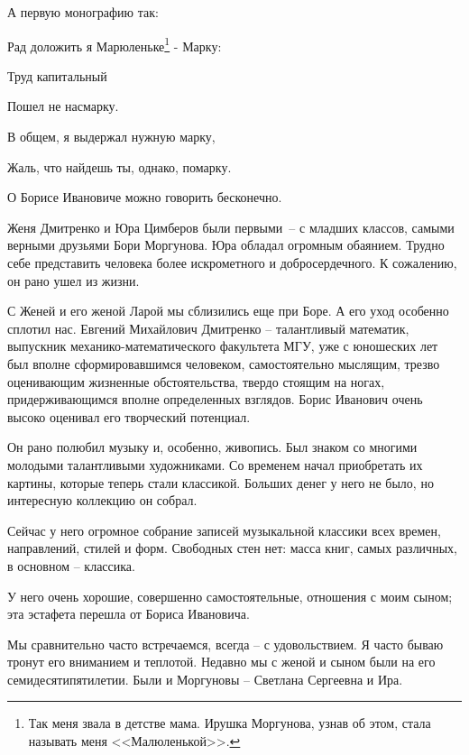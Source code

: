 \indent

\noindent
А первую монографию так:

\indent

{\itshape	

	Рад доложить я Марюленьке\footnote{Так меня звала в детстве мама. Ирушка Моргунова, узнав об этом, стала называть меня <<Малюленькой>>.} - Марку:

	Труд капитальный
	
	Пошел не насмарку.
	
	В общем, я выдержал нужную марку,
	
	Жаль, что найдешь ты, однако, помарку.
}	

\indent

\vspace{-5pt}

\noindent
О Борисе Ивановиче можно говорить бесконечно.

\indent

\vspace{5pt}

Женя Дмитренко и Юра Цимберов были первыми~-- с младших классов, самыми верными друзьями Бори Моргунова. Юра обладал огромным обаянием. Трудно себе представить человека более искрометного и добросердечного. К сожалению, он рано ушел из жизни.

С Женей и его женой Ларой мы сблизились еще при Боре. А его уход особенно сплотил нас. Евгений Михайлович Дмитренко – талантливый математик, выпускник механико-математического факультета МГУ, уже с юношеских лет был вполне сформировавшимся человеком, самостоятельно мыслящим, трезво оценивающим жизненные обстоятельства, твердо стоящим на ногах, придерживающимся вполне определенных взглядов. Борис Иванович очень высоко оценивал его творческий потенциал.

Он рано полюбил музыку и, особенно, живопись. Был знаком со многими молодыми талантливыми художниками. Со временем начал приобретать их картины, которые теперь стали классикой. Больших денег у него не было, но интересную коллекцию он собрал.

Сейчас у него огромное собрание записей музыкальной классики всех времен, направлений, стилей и форм. Свободных стен нет: масса книг, самых различных, в основном – классика.

У него очень хорошие, совершенно самостоятельные, отношения с моим сыном; эта эстафета перешла от Бориса Ивановича.

Мы сравнительно часто встречаемся, всегда – с удовольствием. Я часто бываю тронут его вниманием и теплотой. Недавно мы с женой и сыном были на его семидесятипятилетии. Были и Моргуновы – Светлана Сергеевна и Ира.


